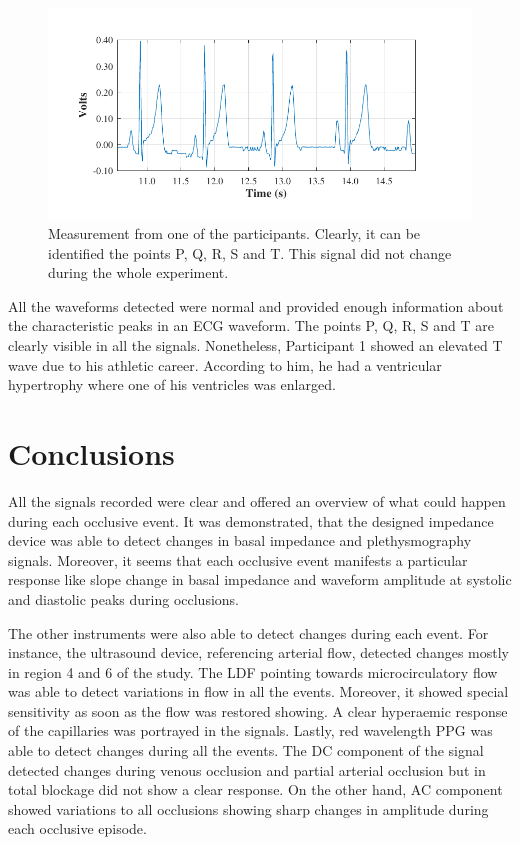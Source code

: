 \begin{figure}[!htbp]
	\centering
	\includegraphics{figure19}    
	\caption[ECG measurement acquired by the system]{Measurement from one of the participants. Clearly, it can be identified the points P, Q, R, S and T. This signal did not change during the whole experiment.}
	\label{fig:ECG}
\end{figure} 

All the waveforms detected were normal and provided enough information about the characteristic peaks in an ECG waveform. The points P, Q, R, S and T are clearly visible in all the signals. Nonetheless, Participant 1 showed an elevated T wave due to his athletic career. According to him, he had a ventricular hypertrophy where one of his ventricles was enlarged.  

\section{Conclusions}
\label{section results 10}
All the signals recorded were clear and offered an overview of what could happen during each occlusive event. It was demonstrated, that the designed impedance device was able to detect changes in basal impedance and plethysmography signals. Moreover, it seems that each occlusive event manifests a particular response like slope change in basal impedance and waveform amplitude at systolic and diastolic peaks during occlusions. 

The other instruments were also able to detect changes during each event. For instance, the ultrasound device, referencing arterial flow, detected changes mostly in region 4 and 6 of the study. The LDF pointing towards microcirculatory flow was able to detect variations in flow in all the events. Moreover, it showed special sensitivity as soon as the flow was restored showing. A clear hyperaemic response of the capillaries was portrayed in the signals. Lastly, red wavelength PPG was able to detect changes during all the events. The DC component of the signal detected changes during venous occlusion and partial arterial occlusion but in total blockage did not show a clear response. On the other hand, AC component showed variations to all occlusions showing sharp changes in amplitude during each occlusive episode. 